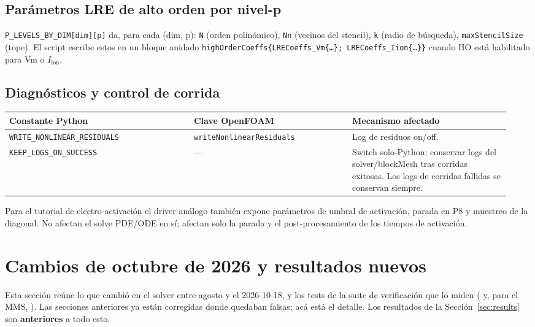 \documentclass[11pt,a4paper]{article}
\newcommand{\code}[1]{\texttt{\small #1}}
\newcommand{\Iion}{I_{\mathrm{ion}}}
\begin{document}
\subsection{Parámetros LRE de alto orden por nivel-p}
\code{P\_LEVELS\_BY\_DIM[dim][p]} da, para cada (dim, p):
\code{N} (orden polinómico), \code{Nn} (vecinos del stencil),
\code{k} (radio de búsqueda), \code{maxStencilSize} (tope). El script escribe estos
en un bloque anidado
\code{highOrderCoeffs\{LRECoeffs\_Vm\{\dots\}; LRECoeffs\_Iion\{\dots\}\}}
cuando HO está habilitado para Vm o $\Iion$.

\subsection{Diagnósticos y control de corrida}
\begin{longtable}{@{}p{0.35\linewidth}p{0.30\linewidth}p{0.30\linewidth}@{}}
\toprule
Constante Python & Clave OpenFOAM & Mecanismo afectado \\
\midrule \endhead
\code{WRITE\_NONLINEAR\_RESIDUALS} &
   \code{writeNonlinearResiduals} & Log de residuos on/off. \\
\code{KEEP\_LOGS\_ON\_SUCCESS} & --- &
   Switch solo-Python: conservar logs del solver/blockMesh tras corridas exitosas.
   Los logs de corridas fallidas se conservan siempre. \\
\bottomrule
\end{longtable}

Para el tutorial de electro-activación el driver análogo también expone parámetros de
umbral de activación, parada en P8 y muestreo de la diagonal. No afectan el solve
PDE/ODE en sí; afectan solo la parada y el post-procesamiento de los tiempos de
activación.

\section{Cambios de octubre de 2026 y resultados nuevos}
\label{sec:oct2026}

Esta sección reúne lo que cambió en el solver entre agosto y el 2026-10-18, y los
tests de la suite de verificación que lo miden
( y, para el
MMS, ). Las secciones anteriores ya están
corregidas donde quedaban falsas; acá está el detalle. Los resultados de la
Sección~\ref{sec:results} son \textbf{anteriores} a todo esto.
\end{document}
